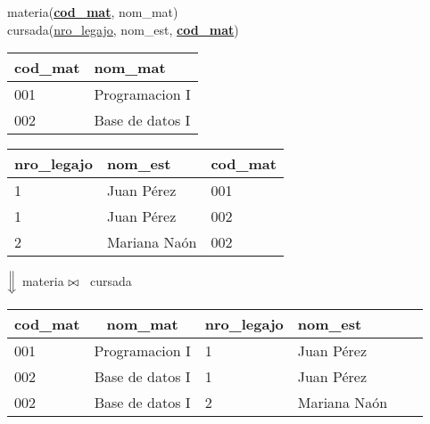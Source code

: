 \documentclass[preview]{standalone}
\begin{document}
materia(\underline{\textbf{cod\_mat}}, nom\_mat)\\
cursada(\underline{nro\_legajo}, nom\_est, \underline{\textbf{cod\_mat}})\\

\begin{center}
\begin{tabular}{| l | l | }\hline			
	\textbf{cod\_mat} & nom\_mat \\\hline			
	001 & Programacion I \\
	002 & Base de datos I \\\hline
\end{tabular}
\quad
\begin{tabular}{| l | l | l | }\hline			
	nro\_legajo & nom\_est & \textbf{cod\_mat} \\\hline			
	1 & Juan P\'erez & 001\\
	1 & Juan P\'erez & 002\\
	2 & Mariana Na\'on & 002 \\\hline
\end{tabular}
\vspace{.35cm}

$\Big\Downarrow$ materia ${\Large\bowtie}$ \ cursada 
\vspace{.35cm}

\begin{tabular}{| l | c | l | l | l | l }\hline			
	\textbf{cod\_mat} & nom\_mat & nro\_legajo & nom\_est \\\hline			
	001 & Programacion I & 1 & Juan P\'erez  \\
	002 & Base de datos I & 1 & Juan P\'erez \\
	002 & Base de datos I & 2 & Mariana Na\'on \\\hline
\end{tabular}
\end{center}
\end{document}
